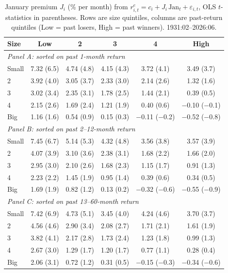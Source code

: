 \begin{table}[H]
\centering\small
\caption{January premium $J_i$ (\% per month) from $r^e_{i,t}=c_i+J_i\,\mathrm{Jan}_t+\varepsilon_{i,t}$, OLS $t$-statistics in parentheses. Rows are size quintiles, columns are past-return quintiles (Low = past losers, High = past winners). 1931:02--2026:06.}
\label{tab:jan}
\begin{tabular}{lccccc}
\toprule
Size & Low & 2 & 3 & 4 & High \\
\midrule
\multicolumn{6}{l}{\textit{Panel A: sorted on past 1-month return}} \\
Small & 7.32 (6.5) & 4.74 (4.8) & 4.15 (4.3) & 3.72 (4.1) & 3.49 (3.7) \\
2 & 3.92 (4.0) & 3.05 (3.7) & 2.33 (3.0) & 2.14 (2.6) & 1.32 (1.6) \\
3 & 3.02 (3.4) & 2.35 (3.1) & 1.78 (2.5) & 1.44 (2.1) & 0.39 (0.5) \\
4 & 2.15 (2.6) & 1.69 (2.4) & 1.21 (1.9) & 0.40 (0.6) & $-$0.10 ($-$0.1) \\
Big & 1.16 (1.6) & 0.54 (0.9) & 0.15 (0.3) & $-$0.11 ($-$0.2) & $-$0.52 ($-$0.8) \\
\midrule
\multicolumn{6}{l}{\textit{Panel B: sorted on past 2--12-month return}} \\
Small & 7.45 (6.7) & 5.14 (5.3) & 4.32 (4.8) & 3.56 (3.8) & 3.57 (3.9) \\
2 & 4.07 (3.9) & 3.10 (3.6) & 2.38 (3.1) & 1.68 (2.2) & 1.66 (2.0) \\
3 & 2.95 (3.0) & 2.10 (2.6) & 1.68 (2.3) & 1.15 (1.7) & 0.91 (1.3) \\
4 & 2.23 (2.2) & 1.45 (1.9) & 0.95 (1.4) & 0.39 (0.6) & 0.34 (0.5) \\
Big & 1.69 (1.9) & 0.82 (1.2) & 0.13 (0.2) & $-$0.32 ($-$0.6) & $-$0.55 ($-$0.9) \\
\midrule
\multicolumn{6}{l}{\textit{Panel C: sorted on past 13--60-month return}} \\
Small & 7.42 (6.9) & 4.73 (5.1) & 3.45 (4.0) & 4.24 (4.6) & 3.70 (3.7) \\
2 & 4.56 (4.6) & 2.90 (3.4) & 2.08 (2.7) & 1.71 (2.1) & 1.61 (1.9) \\
3 & 3.82 (4.1) & 2.17 (2.8) & 1.73 (2.4) & 1.23 (1.8) & 0.99 (1.3) \\
4 & 2.67 (3.0) & 1.29 (1.7) & 1.20 (1.7) & 0.77 (1.1) & 0.28 (0.4) \\
Big & 2.06 (3.1) & 0.72 (1.2) & 0.31 (0.5) & $-$0.15 ($-$0.3) & $-$0.34 ($-$0.6) \\
\bottomrule
\end{tabular}
\end{table}

